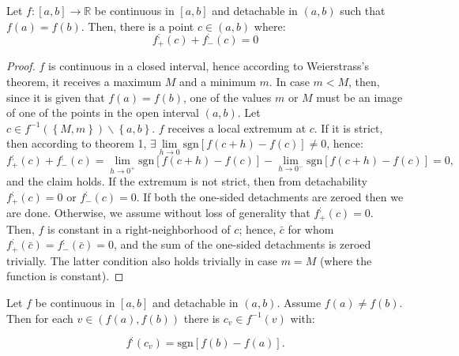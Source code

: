 \documentclass[11pt]{book}
\begin{document}
\begin{theorem}Let $f:\left[a,b\right]\rightarrow\mathbb{R}$ be continuous in $\left[a,b\right]$ and detachable in $\left(a,b\right)$ such that $f\left(a\right)=f\left(b\right).$ Then, there is a point $c\in\left(a,b\right)$ where:
$$f_{+}^{;}\left(c\right)+f_{-}^{;}\left(c\right)=0$$
\label{rolle_theorem_detachment}
\end{theorem}
\begin{proof}$f$ is continuous in a closed interval, hence according to Weierstrass’s theorem, it receives a maximum $M$ and a minimum $m$. In case $m < M$, then, since it is given that $f\left(a\right)=f\left(b\right)$, one of the values $m$ or $M$ must be an image of one of the points in the open interval $\left(a,b\right)$. Let $c\in f^{-1}\left(\left\{ M,m\right\} \right)\backslash\left\{ a,b\right\}$. $f$ receives a local extremum at $c$. If it is strict, then according to theorem 1, $\exists\underset{h\rightarrow0}{\lim}\text{sgn}\left[f\left(c+h\right)-f\left(c\right)\right]\neq0$, hence:
$$f_{+}^{;}\left(c\right)+f_{-}^{;}\left(c\right)=\underset{{\scriptscriptstyle h\rightarrow0^{+}}}{\lim}\text{sgn}\left[f\left(c+h\right)-f\left(c\right)\right]-\underset{{\scriptscriptstyle h\rightarrow0^{-}}}{\lim}\text{sgn}\left[f\left(c+h\right)-f\left(c\right)\right]=0,$$and the claim holds. If the extremum is not strict, then from detachability $f_{+}^{;}\left(c\right)=0$ or $f_{-}^{;}\left(c\right)=0$. If both the one-sided detachments are zeroed then we are done. Otherwise, we assume without loss of generality that $f_{+}^{;}\left(c\right)=0$. Then, $f$ is constant in a right-neighborhood of $c$; hence, $\bar{c}$ for whom $f_{+}^{;}\left(\bar{c}\right)=f_{-}^{;}\left(\bar{c}\right)=0$, and the sum of the one-sided detachments is zeroed trivially. The latter condition also holds trivially in case $m=M$ (where the function is constant).
\end{proof}

\begin{theorem}Let $f$ be continuous in $\left[a,b\right]$ and detachable in $\left(a,b\right)$. Assume $f\left(a\right)\neq f\left(b\right).$ Then for each $v\in\left(f\left(a\right),f\left(b\right)\right)$ there is $c_{v}\in f^{-1}\left(v\right)$ with:

$$f^{;}\left(c_{v}\right)=\text{sgn}\left[f\left(b\right)-f\left(a\right)\right].$$
\label{mvt_detachment_thm}
\end{theorem}
\end{document}
